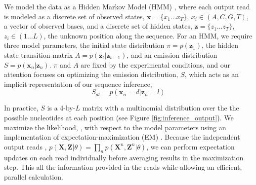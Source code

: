 \documentclass{biophys_letter}
\begin{document}

We model the data as a Hidden Markov Model (HMM) \cite{Rabiner:1989}, where each output read is modeled as a discrete set of observed states, $\mathbf{x}=\{x_{1}\dots x_{T}\}$, $x_i \in (A,C,G,T)$, a vector of observed bases, and a discrete set of hidden states, $\mathbf{z}=\{z_{1} \dots z_{T}\}$, $z_i \in (1 \dots L)$, the unknown position along the sequence.
For an HMM, we require three model parameters, the initial state distribution $\pi=p(\mathbf{z}_{1})$, the hidden state transition matrix $A=p(\mathbf{z}_{t}|\mathbf{z}_{t-1})$, and an emission distribution $S=p(\mathbf{x}_{n}|\mathbf{z}_{n})$. 
$\pi$ and $A$ are fixed by the experimental conditions, and our attention focuses on optimizing the emission distribution, $S$, which acts as an implicit representation of our sequence inference,
\begin{equation}
  S_{dl} = p(\mathbf{x}_n = d |\mathbf{z}_{n} = l)
\end{equation}

In practice, $S$ is a 4-by-$L$ matrix with a multinomial distribution over the the possible nucleotides at each position (see Figure \ref{fig:inference_output}).
We maximize the  likelihood, , with respect to the model parameters using an implementation of  expectation-maximization (EM) \cite{Baum:1970}.
Because the  independent output reads
, $p(\mathbf{X},\mathbf{Z}|\theta)=\prod_{n}p(\mathbf{X}^n,\mathbf{Z}^n|\theta)$, we can perform expectation updates on each read individually before averaging results in the maximization step.
This  all the information provided in the reads while allowing an efficient, parallel calculation.
\end{document}
